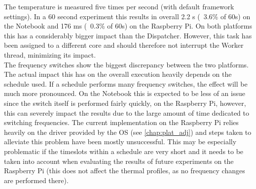 \hspace*{0.5ex}\hspace{0.5ex} The temperature is measured five times per second (with default framework settings). In a 60 second experiment this results in overall 2.2 s (~3.6\% of 60s) on the Notebook and 176 ms (~0.3\% of 60s) on the Raspberry Pi. On both platforms this has a considerably bigger impact than the Dispatcher. However, this task has been assigned to a different core and should therefore not interrupt the Worker thread, minimizing its impact.\\
\hspace*{0.5ex}\hspace{0.5ex} The frequency switches show the biggest discrepancy between the two platforms. The actual impact this has on the overall execution heavily depends on the schedule used. If a schedule performs many frequency switches, the effect will be much more pronounced. On the Notebook this is expected to be less of an issue since the switch itself is performed fairly quickly, on the Raspberry Pi, however, this can severely impact the results due to the large amount of time dedicated to switching frequencies. The current implementation on the Raspberry Pi relies heavily on the driver provided by the OS (see \autoref{chap:plat_adj}) and steps taken to alleviate this problem have been mostly unsuccessful. This may be especially problematic if the timeslots within a schedule are very short and it needs to be taken into account when evaluating the results of future experiments on the Raspberry Pi (this does not affect the thermal profiles, as no frequency changes are performed there).
